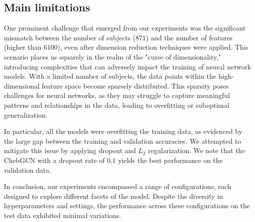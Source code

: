 \subsection{Main limitations}


One prominent challenge that emerged from our experiments was the significant mismatch between the number of subjects ($871$) and the number of features (higher than $6100$), even after dimension reduction techniques were applied. This scenario places us squarely in the realm of the "curse of dimensionality," introducing complexities that can adversely impact the training of neural network models. With a limited number of subjects, the data points within the high-dimensional feature space become sparsely distributed. This sparsity poses challenges for neural networks, as they may struggle to capture meaningful patterns and relationships in the data, leading to overfitting or suboptimal generalization.

In particular, all the models were overfitting the training data, as evidenced by the large gap between the training and validation accuracies. We attempted to mitigate this issue by applying dropout and $L_2$ regularization. We note that the ChebGCN with a dropout rate of $0.1$ yields the best performance on the validation data.

In conclusion, our experiments encompassed a range of configurations, each designed to explore different facets of the model. Despite the diversity in hyperparameters and settings, the performance across these configurations on the test data exhibited minimal variations.